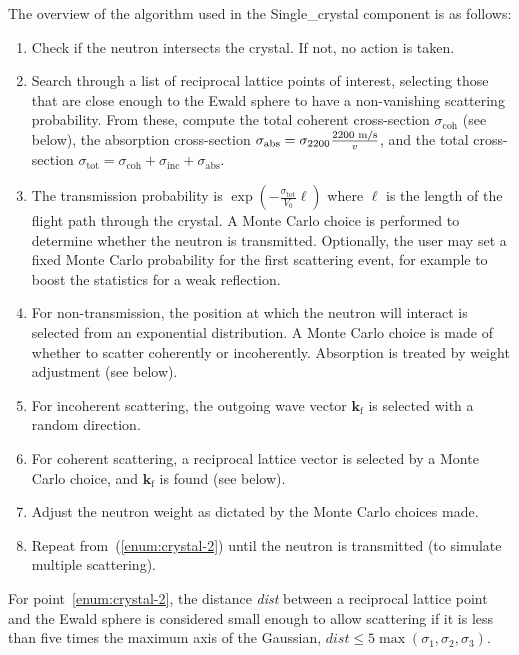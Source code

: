 The overview of the algorithm used in the Single\_crystal component is
as follows:
\begin{enumerate}
\item\label{enum:crystal-1} Check if the neutron intersects the
  crystal. If not, no action is taken.
\item\label{enum:crystal-2} Search through a list of reciprocal lattice
  points of interest, selecting those that are close enough to the Ewald
  sphere to have a non-vanishing scattering probability. From these,
  compute the total coherent cross-section $\sigma_\textrm{coh}$ (see
  below), the absorption cross-section $\sigma_\textrm{abs} = \sigma_{\rm
  2200} \frac{\textrm{2200~m/s}}{v}$, and the total cross-section
  $\sigma_\textrm{tot} = \sigma_\textrm{coh}+\sigma_\textrm{inc}+\sigma_\textrm{abs}$.
\item\label{enum:crystal-3} The transmission probability is
  $\exp(- \frac{\sigma_\textrm{tot}}{V_0}\ell)$ where $\ell$ is the length of
  the flight path through the crystal. A Monte Carlo choice is
  performed to determine
  whether the neutron is transmitted. Optionally, the user may
  set a fixed Monte Carlo probability for the first scattering event,
  for example to boost the statistics for a weak reflection.
\item\label{enum:crystal-4} For non-transmission, the position at which
  the neutron will interact is selected from an exponential
  distribution. A Monte Carlo choice is made of whether to scatter
  coherently or incoherently. Absorption is treated by weight adjustment
  (see below).
\item\label{enum:crystal-5} For incoherent scattering, the outgoing wave
  vector $\boldsymbol{k}_\textrm{f}$ is selected with a random direction.
\item\label{enum:crystal-6} For coherent scattering, a reciprocal
  lattice vector is selected by a Monte Carlo choice, and
  $\boldsymbol{k}_\textrm{f}$ is found (see below).
\item\label{enum:crystal-7} Adjust the neutron weight as dictated by the
  Monte Carlo choices made.
\item\label{enum:crystal-8} Repeat from~(\ref{enum:crystal-2}) until the
  neutron is transmitted (to simulate multiple scattering).
\end{enumerate}

For point~\ref{enum:crystal-2}, the distance
\textit{dist} between a reciprocal lattice point and the Ewald sphere is
considered small enough to allow scattering if it is less than five
times the maximum axis of the Gaussian, $\textit{dist} \leq
5\max(\sigma_1,\sigma_2,\sigma_3)$.


